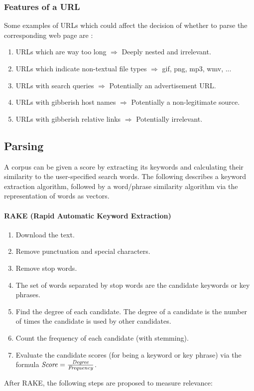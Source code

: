 \documentclass{article}
\begin{document}
\subsubsection{Features of a URL}
\label{sec:5.2.4}
Some examples of URLs which could affect the decision of whether to parse the corresponding web page are \cite{bib-11}:
\begin{enumerate}
	\item URLs which are way too long $ \Rightarrow $ Deeply nested and irrelevant.
	\item URLs which indicate non-textual file types $ \Rightarrow $ gif, png, mp3, wmv, ...
	\item URLs with search queries $ \Rightarrow $ Potentially an advertisement URL.
	\item URLs with gibberish host names $ \Rightarrow $ Potentially a non-legitimate source.
	\item URLs with gibberish relative links $ \Rightarrow $ Potentially irrelevant.
\end{enumerate}
\newpage

\subsection{Parsing}
\label{sec:5.3}
A corpus can be given a score by extracting its keywords and calculating their similarity to the user-specified search words. The following describes a keyword extraction algorithm, followed by a word/phrase similarity algorithm via the representation of words as vectors.

\paragraph{RAKE (Rapid Automatic Keyword Extraction)\cite{bib-12}}
\begin{enumerate}
	\item Download the text.
	\item Remove punctuation and special characters.
	\item Remove stop words.
	\item The set of words separated by stop words are the candidate keywords or key phrases.
	\item Find the degree of each candidate. The degree of a candidate is the number of times the candidate is used by other candidates.
	\item Count the frequency of each candidate (with stemming).
	\item Evaluate the candidate scores (for being a keyword or key phrase) via the formula $ \text{\textit{Score}} = \frac{\text{\textit{Degree}}}{\text{\textit{Frequency}}} $.
\end{enumerate}
After RAKE, the following steps are proposed to measure relevance:
\end{document}
